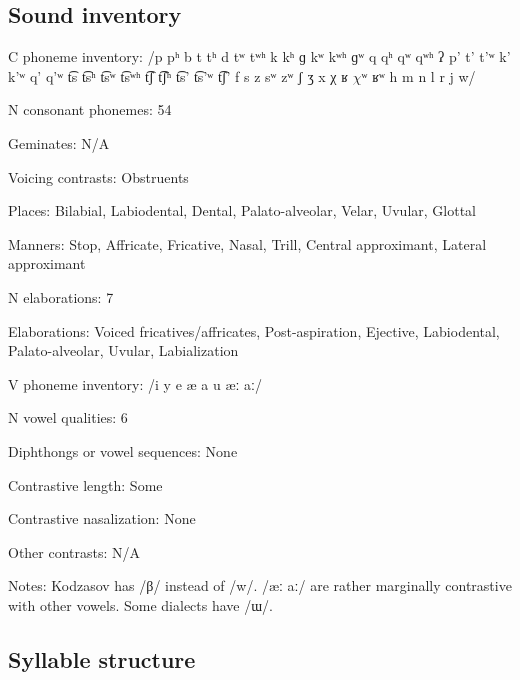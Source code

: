 {\subsection*{Sound inventory}
\begin{appendixdesc}

\item[C phoneme inventory:] /p pʰ b t tʰ d tʷ tʷʰ k kʰ ɡ kʷ kʷʰ ɡʷ q qʰ qʷ qʷʰ ʔ p’ t’ t’ʷ k’ k’ʷ q’ q’ʷ t͡s t͡sʰ t͡sʷ t͡sʷʰ t͡ʃ t͡ʃʰ t͡s’ t͡s’ʷ t͡ʃ’ f s z sʷ zʷ ʃ ʒ x χ ʁ $\chi ʷ$ ʁʷ h m n l r j w/

\item[N consonant phonemes:] 54

\item[Geminates:] N/A

\item[Voicing contrasts:] Obstruents

\item[Places:] Bilabial, Labiodental, Dental, Palato-alveolar, Velar, Uvular, Glottal

\item[Manners:] Stop, Affricate, Fricative, Nasal, Trill, Central approximant, Lateral approximant

\item[N elaborations:] 7

\item[Elaborations:] Voiced fricatives/affricates, Post-aspiration, Ejective, Labiodental, Palato-alveolar, Uvular, Labialization

\item[V phoneme inventory:] /i y e æ a u æː aː/

\item[N vowel qualities:] 6

\item[Diphthongs or vowel sequences:] None

\item[Contrastive length:] Some

\item[Contrastive nasalization:] None

\item[Other contrasts:] N/A

\item[Notes:] Kodzasov has /β/ instead of /w/. /æː aː/ are rather marginally contrastive with other vowels. Some dialects have /ɯ/.
\end{appendixdesc}
\subsection*{Syllable structure}
\begin{appendixdesc}


\end{appendixdesc}}
